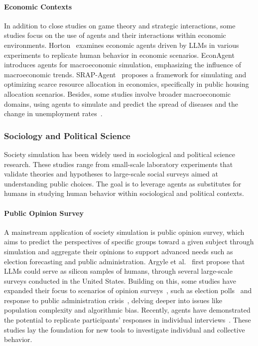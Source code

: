 \paragraph{Economic Contexts}
In addition to close studies on game theory and strategic interactions, some studies focus on the use of agents and their interactions within economic environments. Horton~\cite{horton2023large} examines economic agents driven by LLMs in various experiments to replicate human behavior in economic scenarios. EconAgent~\cite{li2024econagent} introduces agents for macroeconomic simulation, emphasizing the influence of macroeconomic trends. SRAP-Agent~\cite{ji2024srap} proposes a framework for simulating and optimizing scarce resource allocation in economics, specifically in public housing allocation scenarios. Besides, some studies involve broader macroeconomic domains, using agents to simulate and predict the spread of diseases and the change in unemployment rates~\cite{williams2023epidemic,chopra2024limits}. 





\subsubsection{Sociology and Political Science}
Society simulation has been widely used in sociological and political science research.  These studies range from small-scale laboratory experiments that validate theories and hypotheses to large-scale social surveys aimed at understanding public choices. The goal is to leverage agents as substitutes for humans in studying human behavior within sociological and political contexts.


\paragraph{Public Opinion Survey} A mainstream application of society simulation is public opinion survey, which aims to predict the perspectives of specific groups toward a given subject through simulation and aggregate their opinions to support advanced needs such as election forecasting and public administration. Argyle et al.~\cite{Argyle_2023} first propose that LLMs could serve as silicon samples of humans, through several large-scale surveys conducted in the United States. Building on this, some studies have expanded their focus to scenarios of opinion surveys~\cite{lee2023can,chaudhary2024large,chuang2024beyond}, such as election polls~\cite{zhang2024electionsim} and response to public administration crisis~\cite{xiao2023simulating}, delving deeper into issues like population complexity and algorithmic bias. Recently, agents have demonstrated the potential to replicate participants' responses in individual interviews~\cite{park2024generative}. These studies lay the foundation for new tools to investigate individual and collective behavior.



